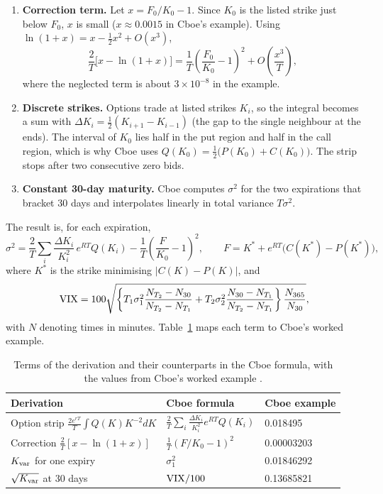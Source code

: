 \begin{enumerate}
  \item \textbf{Correction term.} Let $x=F_0/K_0-1$. Since $K_0$ is the listed strike just below $F_0$, $x$ is small ($x\approx 0.0015$ in Cboe's example). Using $\ln(1+x)=x-\tfrac{1}{2}x^2+O(x^3)$,
  \begin{equation}
    \frac{2}{T}\bigl[x-\ln(1+x)\bigr] = \frac{1}{T}\left(\frac{F_0}{K_0}-1\right)^2 + O\!\left(\frac{x^3}{T}\right),
  \end{equation}
  where the neglected term is about $3\times10^{-8}$ in the example.
  \item \textbf{Discrete strikes.} Options trade at listed strikes $K_i$, so the integral becomes a sum with $\Delta K_i=\tfrac{1}{2}(K_{i+1}-K_{i-1})$ (the gap to the single neighbour at the ends). The interval of $K_0$ lies half in the put region and half in the call region, which is why Cboe uses $Q(K_0)=\tfrac{1}{2}\bigl(P(K_0)+C(K_0)\bigr)$. The strip stops after two consecutive zero bids.
  \item \textbf{Constant 30-day maturity.} Cboe computes $\sigma^2$ for the two expirations that bracket 30 days and interpolates linearly in total variance $T\sigma^2$.
\end{enumerate}
The result is, for each expiration,
\begin{equation}
  \sigma^2 = \frac{2}{T}\sum_i \frac{\Delta K_i}{K_i^2}\,e^{RT}Q(K_i) - \frac{1}{T}\left(\frac{F}{K_0}-1\right)^2,
  \qquad F = K^* + e^{RT}\bigl(C(K^*)-P(K^*)\bigr),
  \label{eq:cboe}
\end{equation}
where $K^*$ is the strike minimising $|C(K)-P(K)|$, and
\begin{equation}
  \mathrm{VIX} = 100\sqrt{\left\{T_1\sigma_1^2\frac{N_{T_2}-N_{30}}{N_{T_2}-N_{T_1}} + T_2\sigma_2^2\frac{N_{30}-N_{T_1}}{N_{T_2}-N_{T_1}}\right\}\frac{N_{365}}{N_{30}}},
  \label{eq:interp}
\end{equation}
with $N$ denoting times in minutes. Table~\ref{tab:map} maps each term to Cboe's worked example.

\begin{table}[H]
\centering
\small
\begin{tabular}{@{}lll@{}}
\toprule
\textbf{Derivation} & \textbf{Cboe formula} & \textbf{Cboe example}\\
\midrule
Option strip $\frac{2e^{rT}}{T}\int Q(K)K^{-2}dK$ & $\frac{2}{T}\sum_i \frac{\Delta K_i}{K_i^2}e^{RT}Q(K_i)$ & 0.018495\\[3pt]
Correction $\frac{2}{T}[x-\ln(1+x)]$ & $\frac{1}{T}(F/K_0-1)^2$ & 0.00003203\\[3pt]
$K_{\mathrm{var}}$ for one expiry & $\sigma_1^2$ & 0.01846292\\[3pt]
$\sqrt{K_{\mathrm{var}}}$ at 30 days & $\mathrm{VIX}/100$ & 0.13685821\\
\bottomrule
\end{tabular}
\caption{Terms of the derivation and their counterparts in the Cboe formula, with the values from Cboe's worked example \cite{cboewp}.}
\label{tab:map}
\end{table}

